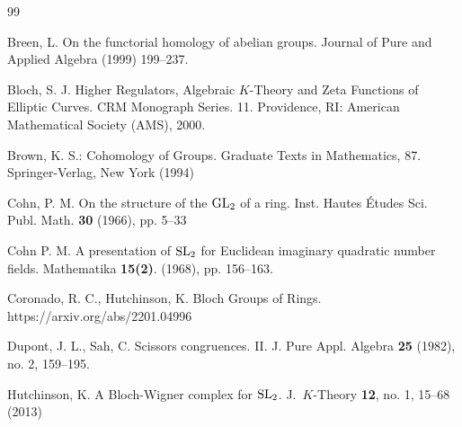 \documentclass[11pt]{amsart}
\theoremstyle{definition}
\theoremstyle{plain}
\numberwithin{equation}{section}
\newcommand{\z}{\mathbb{Z}}
\newcommand{\GL}{\mathit{{\rm GL}}}
\newcommand{\SL}{\mathit{{\rm SL}}}
\begin{document}
\begin{thebibliography}{99}


Breen, L. On the functorial homology of abelian groups. 
Journal of Pure and Applied Algebra {} (1999) 199--237.

Bloch, S. J. Higher Regulators, Algebraic $K$-Theory and Zeta Functions of Elliptic Curves. 
CRM Monograph Series. 11. Providence, RI: American Mathematical Society (AMS), 2000.

Brown, K. S.: Cohomology of Groups. Graduate Texts in Mathematics, 87. Springer-Verlag, New York (1994)

 Cohn, P. M. On the structure of the $\GL_2$ of a ring. Inst. Hautes \'Etudes Sci. Publ. Math. {\bf 30} (1966), pp. 5--33

 Cohn P. M. A presentation of $\SL_2$ for Euclidean imaginary quadratic number fields. Mathematika {\bf 15(2)}. (1968), pp. 156--163.
 
Coronado, R. C.,  Hutchinson, K. Bloch Groups of Rings. https://arxiv.org/abs/2201.04996

Dupont, J. L., Sah, C. Scissors congruences. II. J. Pure Appl. Algebra  {\bf 25}  (1982), no. 2, 159--195.



Hutchinson, K. A Bloch-Wigner complex for $\SL_2$. J.~$K$-Theory {\bf 12}, no. 1, 15--68 (2013)




\end{thebibliography}
\end{document}
